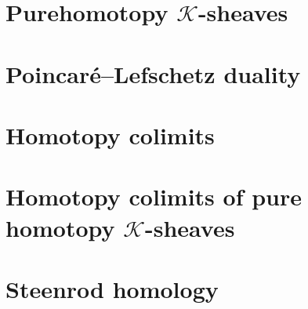\chapter{Purehomotopy $\mathcal{K}$-sheaves}

\chapter{Poincaré–Lefschetz duality}

\chapter{Homotopy colimits}

\chapter{Homotopy colimits of pure homotopy $\mathcal{K}$-sheaves}

\chapter{Steenrod homology}